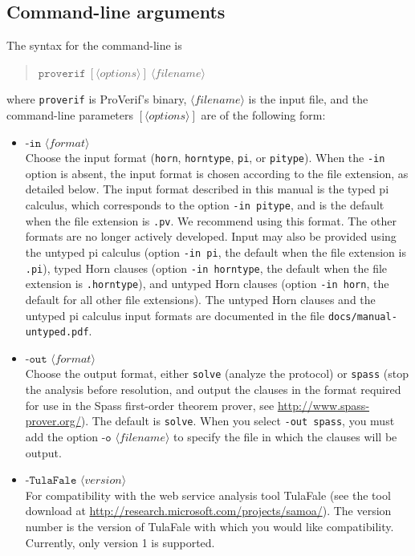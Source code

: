 \documentclass{book}
\newcommand{\nonterm}[1]{\langle\mathit{#1}\rangle}
\newcommand{\filenamevar}{\nonterm{filename}}
\begin{document}
\subsection{Command-line arguments}\label{sec:command-line}\label{sec:altLang}

The syntax for the command-line is
\begin{quote}
	$\texttt{proverif}\ [\nonterm{options}]\ \filenamevar$
\end{quote}
where \texttt{proverif} is ProVerif's binary, $\filenamevar$ is the input file, and the command-line parameters $[\nonterm{options}]$ are of the following form:
%
\begin{itemize}

\item $\texttt{-in }\nonterm{format}$ \\
  Choose the input format (\texttt{horn}, \texttt{horntype},
  \texttt{pi}, or \texttt{pitype}). When the \texttt{-in} option is absent,
  the input format is chosen according to the file extension,
  as detailed below. The input format described in this
  manual is the typed pi calculus, which corresponds to the option
  \texttt{-in pitype}, and is the default when the file extension is
  \texttt{.pv}. We recommend using this format.
  The other formats are no longer actively developed.
  Input may also be provided using the untyped pi calculus (option
  \texttt{-in pi}, the default when the file extension is
  \texttt{.pi}), typed Horn clauses (option \texttt{-in horntype}, the
  default when the file extension is \texttt{.horntype}), and untyped
  Horn clauses (option \texttt{-in horn}, the default for all other
  file extensions). The untyped Horn clauses and the untyped pi
  calculus input formats are documented in the file
  \texttt{docs/manual-untyped.pdf}.

\item $\texttt{-out }\nonterm{format}$ \\
Choose the output format, either \texttt{solve} (analyze the protocol) or \texttt{spass} (stop the analysis before resolution, and output the clauses in the format required for use in the Spass first-order theorem prover, see \url{http://www.spass-prover.org/}). The default is \texttt{solve}. When you select \texttt{-out spass}, you must add the option $\texttt{-o }\nonterm{filename}$ to specify the file in which the clauses will be output.

\item $\texttt{-TulaFale }\nonterm{version}$ \\
  For compatibility with the web service analysis tool TulaFale (see
  the tool download at
  \url{http://research.microsoft.com/projects/samoa/}). The version
  number is the version of TulaFale with which you would like
  compatibility. Currently, only version 1 is supported.


\end{itemize}
\end{document}
